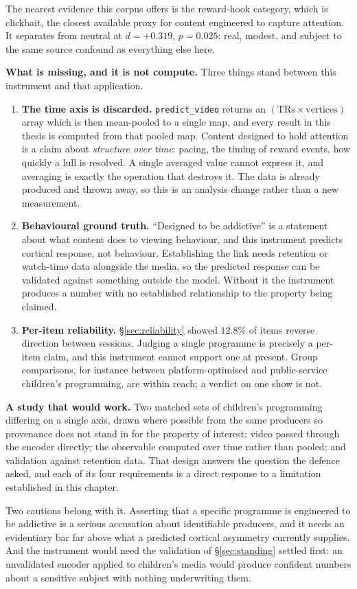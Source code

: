 The nearest evidence this corpus offers is the reward-hook category, which is clickbait, the
closest available proxy for content engineered to capture attention. It separates from
neutral at $d = +0.319$, $p = 0.025$: real, modest, and subject to the same source confound
as everything else here.

\textbf{What is missing, and it is not compute.} Three things stand between this instrument
and that application.

\begin{enumerate}
\item \textbf{The time axis is discarded.} \texttt{predict\_video} returns an
$(\text{TRs} \times \text{vertices})$ array which is then mean-pooled to a single map, and
every result in this thesis is computed from that pooled map. Content designed to hold
attention is a claim about \emph{structure over time}: pacing, the timing of reward events,
how quickly a lull is resolved. A single averaged value cannot express it, and averaging is
exactly the operation that destroys it. The data is already produced and thrown away, so this
is an analysis change rather than a new measurement.
\item \textbf{Behavioural ground truth.} ``Designed to be addictive'' is a statement about
what content does to viewing behaviour, and this instrument predicts cortical response, not
behaviour. Establishing the link needs retention or watch-time data alongside the media, so
the predicted response can be validated against something outside the model. Without it the
instrument produces a number with no established relationship to the property being claimed.
\item \textbf{Per-item reliability.} \S\ref{sec:reliability} showed $12.8\%$ of items reverse
direction between sessions. Judging a single programme is precisely a per-item claim, and
this instrument cannot support one at present. Group comparisons, for instance between
platform-optimised and public-service children's programming, are within reach; a verdict on
one show is not.
\end{enumerate}

\textbf{A study that would work.} Two matched sets of children's programming differing on a
single axis, drawn where possible from the same producers so provenance does not stand in for
the property of interest; video passed through the encoder directly; the observable computed
over time rather than pooled; and validation against retention data. That design answers the
question the defence asked, and each of its four requirements is a direct response to a
limitation established in this chapter.

Two cautions belong with it. Asserting that a specific programme is engineered to be
addictive is a serious accusation about identifiable producers, and it needs an evidentiary
bar far above what a predicted cortical asymmetry currently supplies. And the instrument
would need the validation of \S\ref{sec:standing} settled first: an unvalidated encoder
applied to children's media would produce confident numbers about a sensitive subject with
nothing underwriting them.
